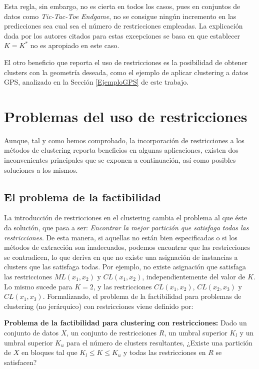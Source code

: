 Esta regla, sin embargo, no es cierta en todos los casos, pues en conjuntos de datos como \textit{Tic-Tac-Toe Endgame}, no se consigue ningún incremento en las predicciones sea cual sea el número de restricciones empleadas. La explicación dada por los autores citados para estas excepciones se basa en que establecer $K = K^*$ no es apropiado en este caso.

El otro beneficio que reporta el uso de restricciones es la posibilidad de obtener clusters con la geometría deseada, como el ejemplo de aplicar clustering a datos \acs{GPS}, analizado en la Sección \ref{EjemploGPS} de este trabajo.

\section{Problemas del uso de restricciones} \label{Problemas}

Aunque, tal y como hemos comprobado, la incorporación de restricciones a los métodos de clustering reporta beneficios en algunas aplicaciones, existen dos inconvenientes principales que se exponen a continuación, así como posibles soluciones a los mismos.

\subsection{El problema de la factibilidad}

La introducción de restricciones en el clustering cambia el problema al que éste da solución, que pasa a ser: \textit{Encontrar la mejor partición que satisfaga todas las restricciones}. De esta manera, si aquellas no están bien especificadas o si los métodos de extracción son inadecuados, podemos encontrar que las restricciones se contradicen, lo que deriva en que no existe una asignación de instancias a clusters que las satisfaga todas. Por ejemplo, no existe asignación que satisfaga las restricciones $ML(x_1,x_2)$ y $CL(x_1,x_2)$, independientemente del valor de $K$. Lo mismo sucede para $K = 2$, y las restricciones $CL(x_1, x_2)$, $CL(x_2, x_3)$ y $CL(x_1, x_3)$. Formalizando, el problema de la factibilidad para problemas de clustering (no jerárquico) con restricciones viene definido por:

\begin{definicion}
	
	\textbf{Problema de la factibilidad para clustering con restricciones:} Dado un conjunto de datos $X$, un conjunto de restricciones $R$, un umbral superior $K_l$ y un umbral superior $K_u$ para el número de clusters resultantes, ¿Existe una partición de $X$ en bloques tal que $K_l \le K \le K_u$ y todas las restricciones en $R$ se satisfacen? \cite{DavidsonRavi:2005a} \cite{Survey:2007}
	
\end{definicion}

